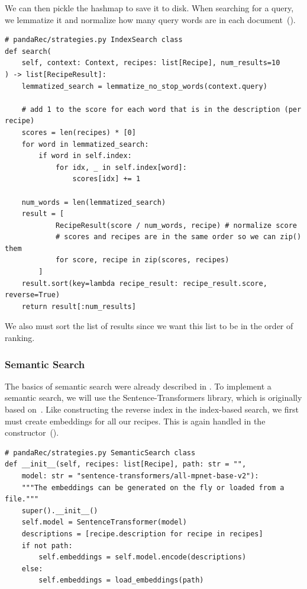 \documentclass[
     12pt,                    %
     a4paper,             %
     BCOR=10mm,     %
     DIV=14,                 %
     listof=totoc,                    %
     bibliography=totoc,       %
     index=totoc,              %
     twoside,
     headsepline
     ]{scrreprt}
\begin{document}
We can then pickle the hashmap to save it to disk.
When searching for a query, we lemmatize it and normalize how many query words are in each document~().

\begin{listing}[htb]
	\begin{verbatim}
# pandaRec/strategies.py IndexSearch class
def search(
	self, context: Context, recipes: list[Recipe], num_results=10
) -> list[RecipeResult]:
	lemmatized_search = lemmatize_no_stop_words(context.query)
	
	# add 1 to the score for each word that is in the description (per recipe)
	scores = len(recipes) * [0]
	for word in lemmatized_search:
		if word in self.index:
			for idx, _ in self.index[word]:
				scores[idx] += 1
	
	num_words = len(lemmatized_search)
	result = [
			RecipeResult(score / num_words, recipe) # normalize score
			# scores and recipes are in the same order so we can zip() them
			for score, recipe in zip(scores, recipes) 
		]
	result.sort(key=lambda recipe_result: recipe_result.score, reverse=True)
	return result[:num_results]
\end{verbatim}
\caption[Searching the Inverted Index]{Searching the Inverted Index.\label{list:searchindex}}
\end{listing}

We also must sort the list of results since we want this list to be in the order of ranking.

\subsubsection{Semantic Search}

The basics of semantic search were already described in . To implement a semantic search, we will use the Sentence-Transformers library, which is originally based on~\cite{reimers2019sentence}. Like constructing the reverse index in the index-based search, we first must create embeddings for all our recipes. This is again handled in the constructor~().

\begin{listing}[htb]
	\begin{verbatim}
# pandaRec/strategies.py SemanticSearch class
def __init__(self, recipes: list[Recipe], path: str = "",
    model: str = "sentence-transformers/all-mpnet-base-v2"):
	"""The embeddings can be generated on the fly or loaded from a file."""
	super().__init__()
	self.model = SentenceTransformer(model)
	descriptions = [recipe.description for recipe in recipes]
	if not path:
		self.embeddings = self.model.encode(descriptions)
	else:
		self.embeddings = load_embeddings(path)
	\end{verbatim}
	\caption[Embedding the Recipes]{Embedding the Recipes.\label{list:embedding}}
\end{listing}
\end{document}
